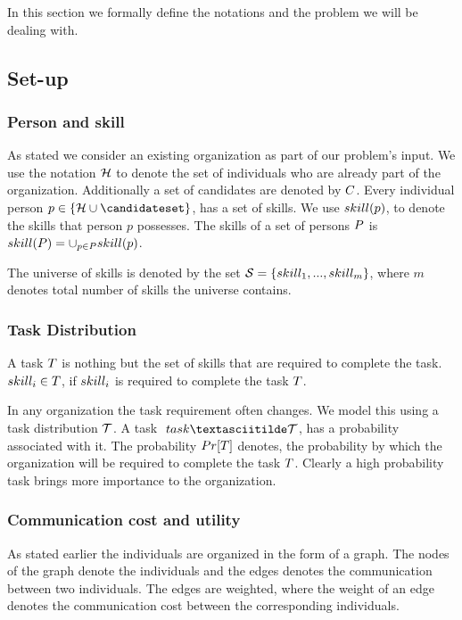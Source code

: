 In this section we formally define the notations and the problem we will be dealing with.
\subsection{Set-up}

\subsubsection{Person and skill}

As stated we consider an existing organization as part of our problem's input. We use the notation $\mathcal{H}$ to denote the set of individuals who are already part of the organization. Additionally a set of candidates are denoted by ${C}$. Every individual person $p \in \{\hiredset \cup \candidateset\}$, has a set of skills. We use $skill(p)$, to denote the skills that person $p$ possesses. The skills of a set of persons $P$ is $skill(P) = \cup_{p \in P} skill(p)$.

The universe of skills is denoted by the set $\mathcal{S} = \{ skill_1, ..., skill_m \}$, where $m$ denotes total number of skills the universe contains.

\subsubsection{Task Distribution}

A task $T$ is nothing but the set of skills that are required to complete the task. $skill_i \in T$, if $skill_i$ is required to complete the task $T$.

In any organization the task requirement often changes. We model this using a task distribution $\mathcal{T}$. A task $\
task \textasciitilde \tasks$, has a probability associated with it. The probability $Pr[T]$ denotes, the probability by which the organization will be required to complete the task $T$. Clearly a high probability task brings more importance to the organization. 

\subsubsection{Communication cost and utility}

As stated earlier the individuals are organized in the form of a graph. The nodes of the graph denote the individuals and the edges denotes the communication between two individuals. The edges are weighted, where the weight of an edge denotes the communication cost between the corresponding individuals.

